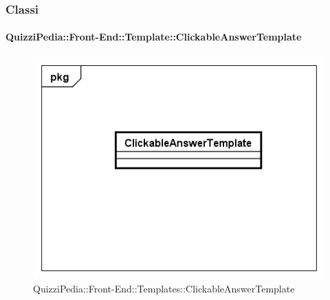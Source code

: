 	\subsubsection{Classi}
	
		\paragraph{QuizziPedia::Front-End::Template::ClickableAnswerTemplate}
		
		\label{QuizziPedia::Front-End::Templates::ClickableAnswerTemplate}
		
		\begin{figure}[ht]
			\centering
			\includegraphics[scale=0.5,keepaspectratio]{UML/Classi/Front-End/QuizziPedia_Front-end_Templates_ClickableAnswerTemplate.png}
			\caption{QuizziPedia::Front-End::Templates::ClickableAnswerTemplate}
		\end{figure} \FloatBarrier
		
